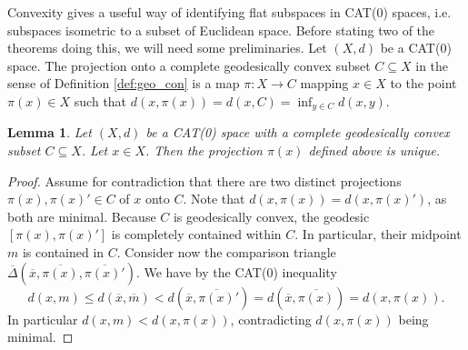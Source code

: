 \documentclass[11pt, a4paper, oneside]{memoir}
\theoremstyle{plain}\newtheorem{theorem}[subsection]{Theorem}
\newtheorem{lemma}[subsection]{Lemma}
\theoremstyle{definition}
\begin{document}
Convexity gives a useful way of identifying flat subspaces in CAT(0) spaces, i.e. subspaces isometric to a subset of Euclidean space. 
Before stating two of the theorems doing this, we will need some preliminaries.
Let \((X,d)\) be a CAT(0) space.
The projection onto a complete geodesically convex subset \(C\subseteq X\) in the sense of Definition \ref{def:geo_con}
is a map \(\pi: X\to C\) mapping \(x\in X\) to the point \(\pi(x)\in X\) such that \(d(x,\pi(x))=d(x,C)=\inf_{y\in C}d(x,y)\).
\begin{lemma}
Let \((X,d)\) be a CAT(0) space with a complete geodesically convex subset \(C\subseteq X\).
Let \(x\in X\).
Then the projection \(\pi(x)\) defined above is unique.
\end{lemma}
\begin{proof}
Assume for contradiction that there are two distinct projections \(\pi(x),\pi(x)'\in C\) of \(x\) onto \(C\).
Note that \(d(x,\pi(x))=d(x,\pi(x)')\), as both are minimal.
Because \(C\) is geodesically convex, the geodesic \([\pi(x),\pi(x)']\) is completely contained within \(C\).
In particular, their midpoint \(m\) is contained in \(C\).
Consider now the comparison triangle \(\overline{\Delta}(\overline{x},\overline{\pi(x)},\overline{\pi(x)'})\).
We have by the CAT(0) inequality
\[d(x,m)\leq d(\overline{x},\overline{m})<d(\overline{x},\overline{\pi(x)}')=d(\overline{x},\overline{\pi(x)})=d(x,\pi(x)).\]
In particular \(d(x,m)<d(x,\pi(x))\), contradicting \(d(x,\pi(x))\) being minimal.
\end{proof}
\end{document}

